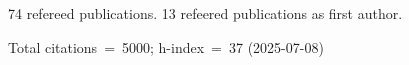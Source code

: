 74 refereed publications. 13 refeered publications as first author.

Total citations~=~5000; h-index~=~37 (2025-07-08)